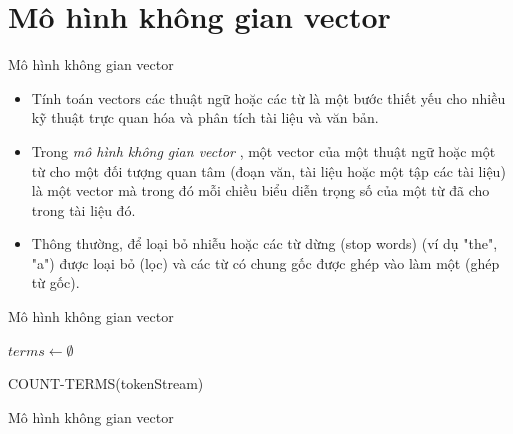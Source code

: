 \documentclass[10pt]{beamer}
\theoremstyle{remark}
\theoremstyle{definition}
\begin{document}
\section{Mô hình không gian vector}

\begin{frame}{Mô hình không gian vector}
	\begin{itemize}
		\item  Tính toán vectors các thuật ngữ hoặc các từ là một bước thiết yếu cho nhiều kỹ thuật trực quan hóa và phân tích tài liệu và văn bản.
		\item Trong \textit{mô hình không gian vector} \cite{356}, một vector của một thuật ngữ hoặc một từ cho một đối tượng quan tâm (đoạn văn, tài liệu hoặc một tập các tài liệu) là một vector mà trong đó mỗi chiều biểu diễn trọng số của một từ đã cho trong tài liệu đó.
		\item Thông thường, để loại bỏ nhiễu hoặc các từ dừng (stop words) (ví dụ "the", "a") được loại bỏ (lọc) và các từ có chung gốc được ghép vào làm một (ghép từ gốc).
	\end{itemize}
\end{frame}


\begin{frame}{Mô hình không gian vector}
	\begin{algorithm}[H]
        \DontPrintSemicolon
        $terms \gets \emptyset$\;
        \;
        \caption{COUNT-TERMS(tokenStream)}
        \label{alg:COUNT-TERMS}
    \end{algorithm}
\end{frame}

\begin{frame}{Mô hình không gian vector}
	\begin{table}[h!]
    \end{table}
\end{frame}
\end{document}
